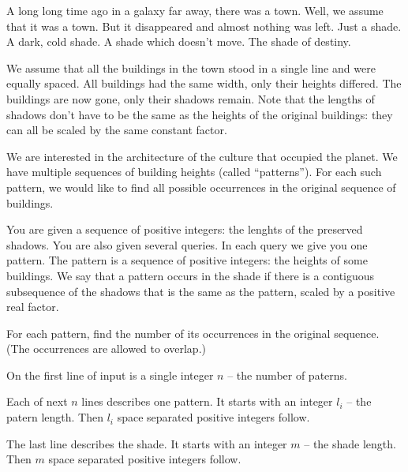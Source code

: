 





A long long time ago in a galaxy far away, there was a town.
Well, we assume that it was a town.
But it disappeared and almost nothing was left.
Just a shade. A dark, cold shade.
A shade which doesn't move.
The shade of destiny.

We assume that all the buildings in the town stood in a single line and were equally spaced.
All buildings had the same width, only their heights differed.
The buildings are now gone, only their shadows remain.
Note that the lengths of shadows don't have to be the same as the heights of the original buildings:
they can all be scaled by the same constant factor.

We are interested in the architecture of the culture that occupied the planet.
We have multiple sequences of building heights (called ``patterns'').
For each such pattern, we would like to find all possible occurrences in the original sequence of buildings.


You are given a sequence of positive integers: the lenghts of the preserved shadows.
You are also given several queries.
In each query we give you one pattern.
The pattern is a sequence of positive integers: the heights of some buildings.
We say that a pattern occurs in the shade if there is a contiguous subsequence of the shadows
that is the same as the pattern, scaled by a positive real factor.

For each pattern, find the number of its occurrences in the original sequence.
(The occurrences are allowed to overlap.)


On the first line of input is a single integer $n$
-- the number of paterns.

Each of next $n$ lines describes one pattern.
It starts with an integer $l_i$ -- the patern length.
Then $l_i$ space separated positive integers follow.

The last line describes the shade.
It starts with an integer $m$ -- the shade length.
Then $m$ space separated positive integers follow.

\bigskip

